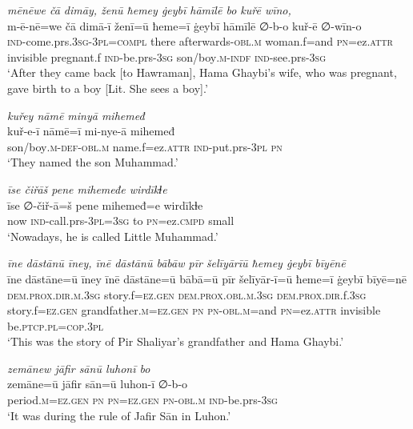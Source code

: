 \ea \label{BP.205}
\textit{mēnēwe čā dimāy, ženū ħemey ġeybī hāmīlē bo kuřē wīno,} \\ 
\gll m-ē-nē=we čā dimā-ī ženī=ū ħeme=ī ġeybī hāmīlē ∅-b-o kuř-ē ∅-wīn-o \\ 
 \textsc{ind-}come.prs\textsc{.3sg}\textsc{-3pl}\textsc{=compl} there afterwards\textsc{-obl}\textsc{.m} woman.f=and \textsc{pn}=ez.\textsc{attr} invisible pregnant.f \textsc{ind-}be.prs\textsc{-3sg} son/boy\textsc{.m}\textsc{-indf} \textsc{ind-}see.prs\textsc{-3sg} \\ 
\glt `After they came back [to Hawraman], Hama Ghaybi’s wife, who was pregnant, gave birth to a boy [Lit. She sees a boy].'
\z 
 
\ea \label{BP.206}
\textit{kuřey nāmē minyā mihemeđ} \\ 
\gll kuř-e-ī nāmē=ī mi-nye-ā mihemeđ \\ 
 son/boy\textsc{.m}\textsc{-def}\textsc{-obl}\textsc{.m} name.f=ez.\textsc{attr} \textsc{ind-}put.prs\textsc{-3pl} \textsc{pn} \\ 
\glt `They named the son Muhammad.'
\z 
 
\ea \label{BP.207}
\textit{īse čiřāš pene mihemeđe wirdīkɫe} \\ 
\gll īse ∅-čiř-ā=š pene mihemeđ=e wirdīkɫe \\ 
 now \textsc{ind-}call.prs\textsc{-3pl}\textsc{=3sg} to \textsc{pn}=ez\textsc{.cmpd} small \\ 
\glt `Nowadays, he is called Little  Muhammad.'
\z 
 
\ea \label{BP.208}
\textit{īne dāstānū īney, īnē dāstānū bābāw pīr šelīyārīū ħemey ġeybī bīyēnē} \\ 
\gll īne dāstāne=ū īney īnē dāstāne=ū bābā=ū pīr šelīyār-ī=ū ħeme=ī ġeybī bīyē=nē \\ 
 \textsc{dem.prox}\textsc{.dir}\textsc{.m}\textsc{.3sg} story.f\textsc{=ez.gen} \textsc{dem.prox}\textsc{.obl}\textsc{.m}\textsc{.3sg} \textsc{dem.prox}\textsc{.dir}.f\textsc{.3sg} story.f\textsc{=ez.gen} grandfather\textsc{.m}\textsc{=ez.gen} \textsc{pn} \textsc{pn}\textsc{-obl}\textsc{.m}=and \textsc{pn}=ez.\textsc{attr} invisible be\textsc{.ptcp}\textsc{.pl}\textsc{=cop}\textsc{.3pl} \\ 
\glt `This was the story of Pir Shaliyar’s grandfather and Hama Ghaybi.'
\z 
 
\ea \label{ŠJ.1}
\textit{zemānew jāfir sānū luhonī bo} \\ 
\gll zemāne=ū jāfir sān=ū luhon-ī ∅-b-o \\ 
 period\textsc{.m}\textsc{=ez.gen} \textsc{pn} \textsc{pn}\textsc{=ez.gen} \textsc{pn}\textsc{-obl}\textsc{.m} \textsc{ind-}be.prs\textsc{-3sg} \\ 
\glt `It was during the rule of Jafir Sān in Luhon.'
\z 
 
